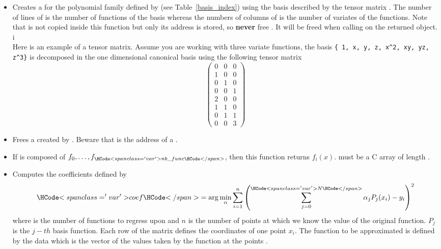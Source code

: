 \begin{itemize}
  \item {}
    \sshortdescribe Creates a  for the polynomial family
    defined by  (see Table~\ref{basis_index}) using the basis
    described by the tensor matrix . The number of lines of  is
    the number of functions of the basis whereas the numbers of columns of
     is the number of variates of the functions.
    Note that  is not copied inside this function but only its address is
    stored, so {\bf never} free . It will be freed when calling
     on the returned object. i\\
    Here is an example of a tensor matrix. Assume you are working with three
    variate functions, the basis \verb!{ 1, x, y, z, x^2, xy, yz, z^3}! is
    decomposed in the one dimensional canonical basis using the following tensor
    matrix
    \[ \left(
    \begin{array}{ccc}
      0 & 0 & 0 \\
      1 & 0 & 0 \\
      0 & 1 & 0 \\
      0 & 0 & 1 \\
      2 & 0 & 0 \\
      1 & 1 & 0 \\
      0 & 1 & 1\\
      0 & 0 & 3
    \end{array}
    \right) \]
    
  \item  {}
    \sshortdescribe Frees a  created by
    . Beware that  is the address of a
    \ptr.

  \item  {}
    \sshortdescribe If  is composed of $f_0, \dots, f_{\var{nb\_func}}$,
    then this function returns $f_i(x)$.  must be a C array of length
    .

  \item {}
    \sshortdescribe Computes the coefficients  defined by
    \begin{equation*}
      \var{coef} = \arg\min_\alpha \sum_{i=1}^n
      \left( \sum_{j=0}^{\var{N}} \alpha_j  P_j(x_i) - y_i\right)^2
    \end{equation*}
    where  is the number of functions to regress upon and $n$ is the
    number of points at which we know the value of the original function. $P_j$
    is the $j-th$ basis function. Each row of the matrix  defines the
    coordinates of one point $x_i$. The function to be approximated is defined
    by the data  which is the vector of the values taken by the function
    at the points .



\end{itemize}
